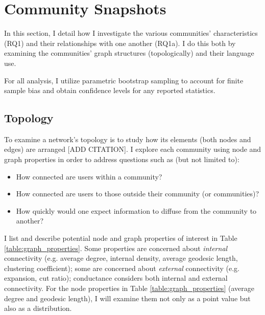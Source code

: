 \documentclass[acmlarge, screen, authorversion]{acmart}
\begin{document}
\section{Community Snapshots}

In this section, I detail how I investigate the various communities' characteristics (RQ1) and their relationships with one another (RQ1a). I do this both by examining the communities' graph structures (topologically) and their language use.

For all analysis, I utilize parametric bootstrap sampling \cite{gentzkowMeasuringGroupDifferences2019} to account for finite sample bias and obtain confidence levels for any reported statistics.

\subsection{Topology}

To examine a network's topology is to study how its elements (both nodes and edges) are arranged [ADD CITATION]. I explore each community using node and graph properties in order to address questions such as (but not limited to):

\begin{itemize}
    \item How connected are users within a community?
    \item How connected are users to those outside their community (or communities)?
    \item How quickly would one expect information to diffuse from the community to another?
\end{itemize}

   I list and describe potential node and graph properties of interest \cite{yangDefiningEvaluatingNetwork2015} in Table \ref{table:graph_properties}. Some properties are concerned about \textit{internal} connectivity (e.g. average degree, internal density, average geodesic length, clustering coefficient); some are concerned about \textit{external} connectivity (e.g. expansion, cut ratio); conductance considers both internal and external connectivity. For the node properties in Table \ref{table:graph_properties} (average degree and geodesic length), I will examine them not only as a point value but also as a distribution. 
\end{document}
